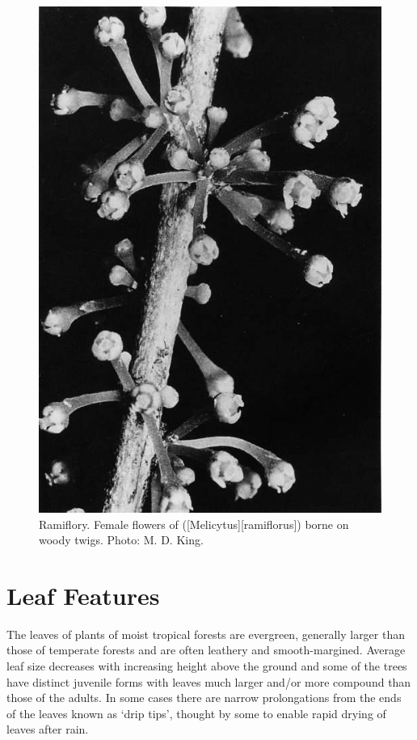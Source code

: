 \begin{figure}[t]
\begin{minipage}[t]{\textwidth}
\begin{minipage}[t]{(\textwidth-\fgap) * \real{0.378}}
			\includegraphics[width=\textwidth]{graphics/figure17mahoe.jpg}
			\caption[Ramiflory.
			Female flowers of mahoe]{Ramiflory.
			Female flowers of  ([Melicytus][ramiflorus]) borne on woody twigs.
			Photo:  M. D. King.}%
			\label{fig:17mahoe}
		\end{minipage}
	\end{minipage}
\end{figure}

\section{Leaf Features}

The leaves of plants of moist tropical forests are evergreen, generally larger than those of temperate forests and are often leathery and smooth-margined.
Average leaf size decreases with increasing height above the ground and some of the trees have distinct juvenile forms with leaves much larger and/or more compound than those of the adults.
In some cases there are narrow prolongations from the ends of the leaves known as `drip tips', thought by some to enable rapid drying of leaves after rain.

